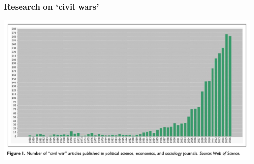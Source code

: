 \documentclass[aspectratio=43]{beamer}
\begin{document}
\begin{frame}
\frametitle{Research on `civil wars'}
\centering

\includegraphics[width = \textwidth]{img/cw_studies}

\end{frame}
\end{document}
